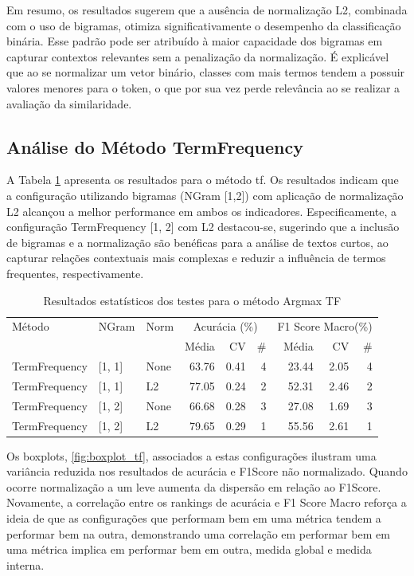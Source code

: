 Em resumo, os resultados sugerem que a ausência de normalização L2, combinada com o uso de bigramas, otimiza significativamente o desempenho da classificação binária. Esse padrão pode ser atribuído à maior capacidade dos bigramas em capturar contextos relevantes sem a penalização da normalização.  É explicável que ao se normalizar um vetor binário, classes com mais termos tendem a possuir valores menores para o token, o que por sua vez perde relevância ao se realizar a avaliação da similaridade.

\subsection{Análise do Método TermFrequency}

A Tabela \ref{tab:resultadoargmaxtf_rankings} apresenta os resultados para o método tf.  Os resultados indicam que a configuração utilizando bigramas (NGram [1,2]) com aplicação de normalização L2 alcançou a melhor performance em ambos os indicadores. Especificamente, a configuração TermFrequency [1, 2] com L2 destacou-se, sugerindo que a inclusão de bigramas e a normalização são benéficas para a análise de textos curtos, ao capturar relações contextuais mais complexas e reduzir a influência de termos frequentes, respectivamente.

\begin{table}[H]
\centering
\caption{Resultados estatísticos dos testes para o método Argmax TF}
\label{tab:resultadoargmaxtf_rankings}
\footnotesize %
\begin{tabular}{lllrrrrrr}
\hline
Método & NGram & Norm & \multicolumn{3}{c}{Acurácia (\%)} & \multicolumn{3}{c}{F1 Score Macro(\%)} \\
& & & Média & CV & \# & Média & CV & \# \\
\hline
TermFrequency & [1, 1] & None & 63.76 & 0.41 & 4 & 23.44 & 2.05 & 4 \\
TermFrequency & [1, 1] & L2 & 77.05 & 0.24 & 2 & 52.31 & 2.46 & 2 \\
TermFrequency & [1, 2] & None & 66.68 & 0.28 & 3 & 27.08 & 1.69 & 3 \\
TermFrequency & [1, 2] & L2 & 79.65 & 0.29 & 1 & 55.56 & 2.61 & 1 \\
\hline
\end{tabular}
\end{table}

Os boxplots, \ref{fig:boxplot_tf}, associados a estas configurações ilustram uma variância reduzida nos resultados de acurácia e F1Score não normalizado.  Quando ocorre normalização a um leve aumenta da dispersão em relação ao F1Score. Novamente, a correlação entre os rankings de acurácia e F1 Score Macro reforça a ideia de que as configurações que performam bem em uma métrica tendem a performar bem na outra, demonstrando uma correlação em performar bem em uma métrica implica em performar bem em outra, medida global e medida interna.

